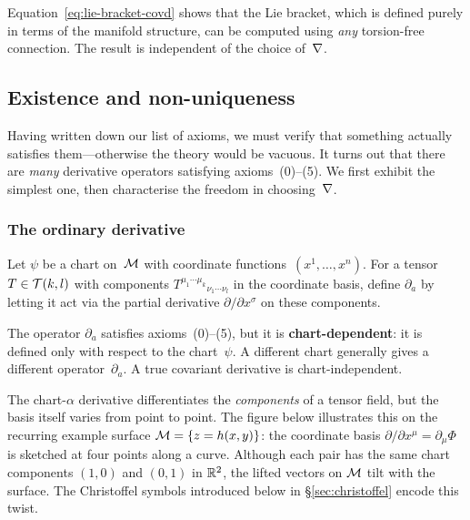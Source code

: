 \begin{remark}
  Equation~\eqref{eq:lie-bracket-covd} shows that the Lie
  bracket, which is defined purely in terms of the manifold
  structure, can be computed using \emph{any} torsion-free
  connection.  The result is independent of the choice of~$\nabla$.
\end{remark}

\subsection{Existence and non-uniqueness}%
\label{sec:existence-nonuniqueness}

Having written down our list of axioms, we must verify that
something actually satisfies them---otherwise the theory would
be vacuous.  It turns out that there are \emph{many} derivative
operators satisfying axioms~(0)--(5).  We first exhibit the
simplest one, then characterise the freedom in choosing~$\nabla$.

\subsubsection{The ordinary derivative}\label{sec:ordinary-deriv}

Let $\psi$ be a chart on~$\mathcal{M}$ with coordinate
functions~$(x^1,\dots,x^n)$.  For a tensor
$T\in\mathcal{T}(k,l)$ with components
$T^{\mu_1\cdots\mu_k}{}_{\nu_1\cdots\nu_l}$ in the coordinate
basis, define $\partial_a$ by letting it act via the partial
derivative $\partial/\partial x^\sigma$ on these components.

\begin{remark}
  The operator $\partial_a$ satisfies axioms~(0)--(5), but it is
  \textbf{chart-dependent}: it is defined only with respect to
  the chart~$\psi$.  A different chart generally gives a
  different operator~$\partial_a$.  A true covariant derivative
  is chart-independent.
\end{remark}

\noindent
The chart-$\alpha$ derivative differentiates the
\emph{components} of a tensor field, but the basis itself varies
from point to point.  The figure below illustrates this on the
recurring example surface $\mathcal{M} = \{z = h(x,y)\}$: the coordinate
basis $\partial/\partial x^\mu = \partial_\mu\Phi$ is sketched at
four points along a curve.  Although each pair has the same chart
components $(1,0)$ and $(0,1)$ in $\mathbb{R}^{2}$, the lifted vectors on
$\mathcal{M}$ tilt with the surface.  The Christoffel symbols introduced
below in \S\ref{sec:christoffel} encode this twist.

